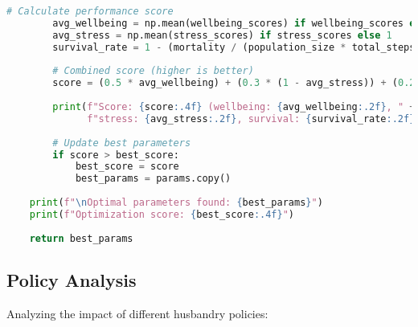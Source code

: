 \documentclass[11pt,a4paper]{article}
\begin{document}
\begin{lstlisting}[language=Python]
        # Calculate performance score
        avg_wellbeing = np.mean(wellbeing_scores) if wellbeing_scores else 0
        avg_stress = np.mean(stress_scores) if stress_scores else 1
        survival_rate = 1 - (mortality / (population_size * total_steps))
        
        # Combined score (higher is better)
        score = (0.5 * avg_wellbeing) + (0.3 * (1 - avg_stress)) + (0.2 * survival_rate)
        
        print(f"Score: {score:.4f} (wellbeing: {avg_wellbeing:.2f}, " +
              f"stress: {avg_stress:.2f}, survival: {survival_rate:.2f})")
        
        # Update best parameters
        if score > best_score:
            best_score = score
            best_params = params.copy()
            
    print(f"\nOptimal parameters found: {best_params}")
    print(f"Optimization score: {best_score:.4f}")
    
    return best_params
\end{lstlisting}

\subsection{Policy Analysis}
Analyzing the impact of different husbandry policies:
\end{document}

